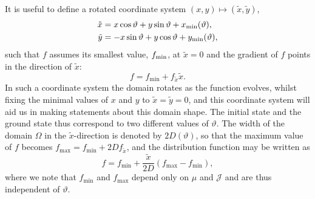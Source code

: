 It is useful to define a rotated coordinate system $(x,y)\mapsto(\tilde{x},\tilde{y})$, 
\begin{equation}
\begin{aligned}
\tilde{x} &= x \cos \vartheta + y \sin \vartheta + x_{\rm min}(\vartheta), \\
\tilde{y} &= - x \sin \vartheta + y \cos \vartheta + y_{\rm min}(\vartheta),
\end{aligned}
\end{equation}
such that $f$ assumes its smallest value, $f_{\rm min}$, at $\tilde x = 0$ and the gradient of $f$ points in the direction of $\tilde x$:
\begin{equation}
    f = f_\mathrm{min} + f_{\tilde{x}} \tilde{x}.
\end{equation}
In such a coordinate system the domain rotates as the function evolves, whilst fixing the minimal values of $x$ and $y$ to $\tilde{x}=\tilde{y}=0$, and this coordinate system will aid us in making statements about this domain shape. The initial state and the ground state thus correspond to two different values of $\vartheta$. The width of the domain $\Omega$ in the $\tilde x$-direction is denoted by $2D(\vartheta)$, so that the maximum value of $f$ becomes $f_\mathrm{max} = f_\mathrm{min} + 2 D f_{\tilde{x}}$, and the distribution function may be written as
\begin{equation}
    f = f_\mathrm{min} + \frac{\tilde{x}}{2D} \left( f_\mathrm{max} - f_\mathrm{min} \right),
\end{equation}
where we note that $f_\mathrm{min}$ and $f_\mathrm{max}$ depend only on $\mu$ and $\mathcal{J}$ and are thus independent of $\vartheta$. 

